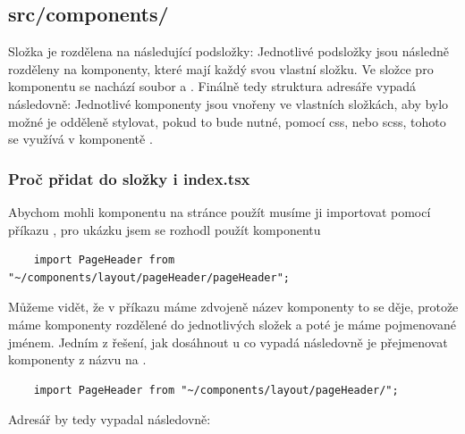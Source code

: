 \subsection{src/components/}
Složka je rozdělena na následující podsložky:
\hfill \break
Jednotlivé podsložky jsou následně rozděleny na komponenty, které mají každý svou vlastní složku.
Ve složce pro komponentu se nachází soubor  a .
\hfill \break
Finálně tedy struktura adresáře vypadá následovně:
Jednotlivé komponenty jsou vnořeny ve vlastních složkách, aby bylo možné je odděleně stylovat, pokud to bude nutné, pomocí css, nebo scss, tohoto se využívá v komponentě .
\subsubsection{Proč přidat do složky i index.tsx}
Abychom mohli komponentu na stránce použít musíme ji importovat pomocí příkazu , pro ukázku jsem se rozhodl použít komponentu 
\begin{lstlisting}
    import PageHeader from "~/components/layout/pageHeader/pageHeader";
\end{lstlisting}
Můžeme vidět, že v příkazu máme zdvojeně název komponenty to se děje, protože máme komponenty rozdělené do jednotlivých složek a poté je máme pojmenované jménem. Jedním z řešení, jak dosáhnout u co vypadá následovně je přejmenovat komponenty z názvu na .
\begin{lstlisting}
    import PageHeader from "~/components/layout/pageHeader/";
\end{lstlisting}
Adresář by tedy vypadal následovně:

